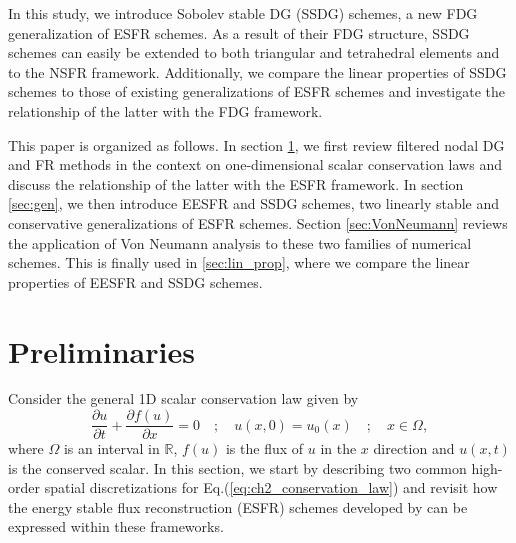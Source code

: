 \documentclass[preprint,12pt]{elsarticle}
\begin{document}
In this study, we introduce Sobolev stable DG (SSDG) schemes, a new FDG generalization of ESFR schemes. As a result of their FDG structure, SSDG schemes can easily be extended to both triangular and tetrahedral elements and to the NSFR framework. Additionally, we compare the linear properties of SSDG schemes to those of existing generalizations of ESFR schemes and investigate the relationship of the latter with the FDG framework.

This paper is organized as follows. In section \ref{sec:preliminaries}, we first review filtered nodal DG and FR methods in the context on one-dimensional scalar conservation laws and discuss the relationship of the latter with the ESFR framework. In section \ref{sec:gen}, we then introduce EESFR and SSDG schemes, two linearly stable and conservative generalizations of ESFR schemes. Section \ref{sec:VonNeumann} reviews the application of Von Neumann analysis to these two families of numerical schemes. This is finally used in \ref{sec:lin_prop}, where we compare the linear properties of EESFR and SSDG schemes.

\section{Preliminaries}
\label{sec:preliminaries}
Consider the general 1D scalar conservation law given by
\begin{equation}
    \frac{\partial u}{\partial t} + \frac{\partial f(u)}{\partial x} = 0
    \quad ; \quad
    u(x,0) = u_0(x)
    \quad ; \quad
    x \in \Omega,
    \label{eq:ch2_conservation_law}
\end{equation}
where $\Omega$ is an interval in $\mathbb{R}$, $f(u)$ is the flux of $u$ in the $x$ direction and $u(x,t)$ is the conserved scalar. In this section, we start by describing two common high-order spatial discretizations for Eq.(\ref{eq:ch2_conservation_law}) and revisit how the energy stable flux reconstruction (ESFR) schemes developed by \cite{vincent2011new} can be expressed within these frameworks.
\end{document}
